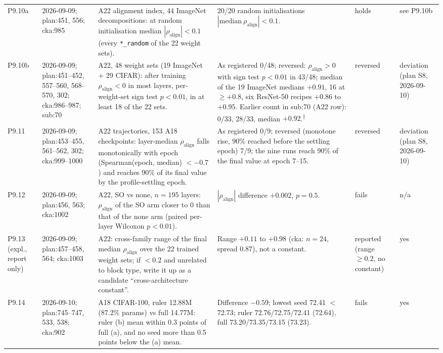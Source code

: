 \begin{longtable}{p{1.1cm}p{1.4cm}p{6.2cm}p{4.6cm}p{2.0cm}p{1.6cm}}
P9.10a & 2026-09-09; plan:451, 556; cka:985 & A22 alignment index, 44 ImageNet decompositions: at random initialisation median $|\rho_{\mathrm{align}}| < 0.1$ (every \texttt{*\_random} of the 22 weight sets). & 20/20 random initialisations $|\mathrm{median}\ \rho_{\mathrm{align}}| < 0.1$. & holds & see P9.10b \\
P9.10b & 2026-09-09; plan:451--452, 557--560, 568--570, 302; cka:986--987; sub:70 & A22, 48 weight sets (19 ImageNet $+$ 29 CIFAR): after training $\rho_{\mathrm{align}} < 0$ in most layers, per-weight-set sign test $p<0.01$, in at least 18 of the 22 sets. & As registered 0/48; reversed: $\rho_{\mathrm{align}} > 0$ with sign test $p<0.01$ in 43/48; median of the 19 ImageNet medians $+0.91$, 16 at $\ge +0.8$, six ResNet-50 recipes $+0.86$ to $+0.95$. Earlier count in sub:70 (A22 row): 0/33, 28/33, median $+0.92$.\textsuperscript{$\dagger$} & reversed & deviation (plan S8, 2026-09-10) \\
P9.11 & 2026-09-09; plan:453--455, 561--562, 302; cka:999--1000 & A22 trajectories, 153 A18 checkpoints: layer-median $\rho_{\mathrm{align}}$ falls monotonically with epoch (Spearman(epoch, median) $< -0.7$) and reaches 90\% of its final value by the profile-settling epoch. & As registered 0/9; reversed (monotone rise, 90\% reached before the settling epoch) 7/9; the nine runs reach 90\% of the final value at epoch 7--15. & reversed & deviation (plan S8, 2026-09-10) \\
P9.12 & 2026-09-09; plan:456, 563; cka:1002 & A22, SO vs none, $n = 195$ layers: $\rho_{\mathrm{align}}$ of the SO arm closer to 0 than that of the none arm (paired per-layer Wilcoxon $p<0.01$). & $|\rho_{\mathrm{align}}|$ difference $+0.002$, $p = 0.5$. & fails & n/a \\
P9.13 (expl., report only) & 2026-09-09; plan:457--458, 564; cka:1003 & A22: cross-family range of the final median $\rho_{\mathrm{align}}$ over the 22 trained weight sets; if $< 0.2$ and unrelated to block type, write it up as a candidate ``cross-architecture constant''. & Range $+0.11$ to $+0.98$ (cka: $n = 24$, spread 0.87), not a constant. & reported (range $\ge 0.2$, no constant) & yes \\
P9.14 & 2026-09-10; plan:745--747, 533, 538; cka:902 & A18 CIFAR-100, ruler 12.88M (87.2\% params) vs full 14.77M: ruler (b) mean within 0.3 points of full (a), and no seed more than 0.5 points below the (a) mean. & Difference $-0.59$; lowest seed 72.41 $<$ 72.73; ruler 72.76/72.75/72.41 (72.64), full 73.20/73.35/73.15 (73.23). & fails & yes \\

\end{longtable}
